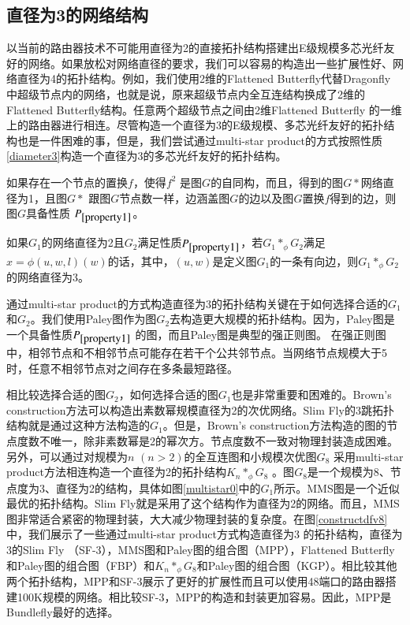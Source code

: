  \subsection{直径为3的网络结构}
   以当前的路由器技术不可能用直径为2的直接拓扑结构搭建出E级规模多芯光纤友好的网络。如果放松对网络直径的要求，我们可以容易的构造出一些扩展性好、网络直径为4的拓扑结构。例如，我们使用2维的Flattened Butterfly代替Dragonfly 中超级节点内的网络，也就是说，原来超级节点内全互连结构换成了2维的Flattened Butterfly结构。任意两个超级节点之间由2维Flattened Butterfly 的一维上的路由器进行相连。尽管构造一个直径为3的E级规模、多芯光纤友好的拓扑结构也是一件困难的事，但是，我们尝试通过multi-star product的方式按照性质\ref{diameter3}构造一个直径为3的多芯光纤友好的拓扑结构。

   \begin{prop}
\label{property1}
如果存在一个节点的置换$f$，使得$f^{2}$ 是图$G$的自同构，而且，得到的图$G*$网络直径为1，且图$G*$ 跟图$G$节点数一样，边涵盖图$G$的边以及图$G$置换$f$得到的边，则图$G$具备性质 $P_{\ref{property1}}$。
\end{prop}

\begin{theo}
\label{diameter3}
如果$G_{1}$的网络直径为2且$G_{2}$满足性质$P_{\ref{property1}}$，若$G_{1}*_{\phi} G_{2}$满足$x=\phi(u,w,l)(w)$的话，其中，$(u,w)$是定义图$G_{1}$的一条有向边，则$G_{1}*_{\phi} G_{2}$的网络直径为3。
\end{theo}

通过multi-star product的方式构造直径为3的拓扑结构关键在于如何选择合适的$G_{1}$和$G_{2}$。我们使用Paley图作为图$G_{2}$去构造更大规模的拓扑结构。因为，Paley图是一个具备性质$P_{\ref{property1}}$ 的图，而且Paley图是典型的强正则图。
在强正则图中，相邻节点和不相邻节点可能存在若干个公共邻节点。当网络节点规模大于5时，任意不相邻节点对之间存在多条最短路径。

相比较选择合适的图$G_{2}$，如何选择合适的图$G_{1}$也是非常重要和困难的。Brown's construction方法可以构造出素数幂规模直径为2的次优网络。Slim Fly的3跳拓扑结构就是通过这种方法构造的$G_{1}$。但是，Brown's construction方法构造的图的节点度数不唯一，除非素数幂是2的幂次方。节点度数不一致对物理封装造成困难。另外，可以通过对规模为$n$ $(n>2)$的全互连图和小规模次优图$G_{8}$ 采用multi-star product方法相连构造一个直径为2的拓扑结构$K_{n}*_{\phi}G_{8}$ 。图$G_{8}$是一个规模为8、节点度为3、直径为2的结构，具体如图\ref{multistar0}中的$G_{1}$所示。MMS图是一个近似最优的拓扑结构。Slim Fly就是采用了这个结构作为直径为2的网络。而且，MMS图非常适合紧密的物理封装，大大减少物理封装的复杂度。在图\ref{constructdfv8}中，我们展示了一些通过multi-star product方式构造直径为3 的拓扑结构，直径为3的Slim Fly （SF-3），MMS图和Paley图的组合图（MPP），Flattened Butterfly和Paley图的组合图（FBP）和$K_{n}*_{\phi}G_{8}$和Paley图的组合图（KGP）。相比较其他两个拓扑结构，MPP和SF-3展示了更好的扩展性而且可以使用48端口的路由器搭建100K规模的网络。相比较SF-3，MPP的构造和封装更加容易。因此，MPP是Bundlefly最好的选择。

